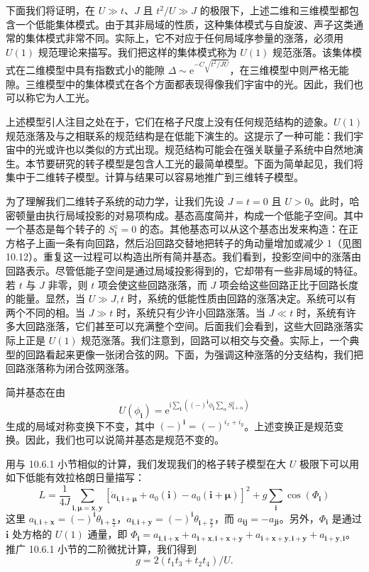 下面我们将证明，在 $U\gg t$、$J$ 且 $t^{2}/U\gg J$ 的极限下，上述二维和三维模型都包含一个低能集体模式。由于其非局域的性质，这种集体模式与自旋波、声子这类通常的集体模式非常不同。实际上，它不对应于任何局域序参量的涨落，必须用 $U(1)$ 规范理论来描写。我们把这样的集体模式称为 $U(1)$ 规范涨落。该集体模式在二维模型中具有指数式小的能隙 $\Delta\sim\mathrm{e}^{-C\sqrt{t^{2}/JU}}$，在三维模型中则严格无能隙。三维模型中的集体模式在各个方面都表现得像我们宇宙中的光。因此，我们也可以称它为人工光。

上述模型引人注目之处在于，它们在格子尺度上没有任何规范结构的迹象。$U(1)$ 规范涨落及与之相联系的规范结构是在低能下演生的。这提示了一种可能：我们宇宙中的光或许也以类似的方式出现。规范结构可能会在强关联量子系统中自然地演生。本节要研究的转子模型是包含人工光的最简单模型。下面为简单起见，我们将集中于二维转子模型。计算与结果可以容易地推广到三维转子模型。

为了理解我们二维转子系统的动力学，让我们先设 $J=t=0$ 且 $U>0$。此时，哈密顿量由执行局域投影的对易项构成。基态高度简并，构成一个低能子空间。其中一个基态是每个转子的 $S^{z}_{\pmb i}=0$ 的态。其他基态可以从这个基态出发来构造：在正方格子上画一条有向回路，然后沿回路交替地把转子的角动量增加或减少 1（见图 10.12）。重复这一过程可以构造出所有简并基态。我们看到，投影空间中的涨落由回路表示。尽管低能子空间是通过局域投影得到的，它却带有一些非局域的特征。若 $t$ 与 $J$ 非零，则 $t$ 项会使这些回路涨落，而 $J$ 项会给这些回路正比于回路长度的能量。显然，当 $U\gg J,t$ 时，系统的低能性质由回路的涨落决定。系统可以有两个不同的相。当 $J\gg t$ 时，系统只有少许小回路涨落。当 $J\ll t$ 时，系统有许多大回路涨落，它们甚至可以充满整个空间。后面我们会看到，这些大回路涨落实际上正是 $U(1)$ 规范涨落。我们注意到，回路可以相交与交叠。实际上，一个典型的回路看起来更像一张闭合弦的网。下面，为强调这种涨落的分支结构，我们把回路涨落称为闭合弦网涨落。

简并基态在由
\begin{equation*}
U(\phi_{\pmb i})=\mathrm{e}^{\mathrm{i}\sum_{\pmb i}((-)^{\pmb i}\phi_{\pmb i}\sum_{\alpha}S^{z}_{\pmb i+\alpha})}\tag{10.6.8}
\end{equation*}
生成的局域对称变换下不变，其中 $(-)^{\pmb i}=(-)^{i_x+i_y}$。上述变换正是规范变换。因此，我们也可以说简并基态是规范不变的。

用与 10.6.1 小节相似的计算，我们发现我们的格子转子模型在大 $U$ 极限下可以用如下低能有效拉格朗日量描写：
\begin{equation*}
L=\frac{1}{4J}\sum_{\pmb i,\pmb\mu=\pmb x,\pmb y}[\dot{a}_{\pmb i,\pmb i+\pmb\mu}+a_0(\pmb i)-a_0(\pmb i+\pmb\mu)]^{2}+g\sum_{\pmb i}\cos(\Phi_{\pmb i})\tag{10.6.9}
\end{equation*}
这里 $a_{\pmb i,\pmb i+\pmb x}=(-)^{\pmb i}\theta_{\pmb i+\frac{\pmb x}{2}}$，$a_{\pmb i,\pmb i+\pmb y}=(-)^{\pmb i}\theta_{\pmb i+\frac{\pmb y}{2}}$，而 $a_{\pmb i\pmb j}=-a_{\pmb j\pmb i}$。另外，$\Phi_{\pmb i}$ 是通过 $\pmb i$ 处方格的 $U(1)$ 通量，即 $\Phi_{\pmb i}=a_{\pmb i,\pmb i+\pmb x}+a_{\pmb i+\pmb x,\pmb i+\pmb x+\pmb y}+a_{\pmb i+\pmb x+\pmb y,\pmb i+\pmb y}+a_{\pmb i+\pmb y,\pmb i}$。推广 10.6.1 小节的二阶微扰计算，我们得到
\begin{equation*}
g=2(t_1t_3+t_2t_4)/U.
\end{equation*}

